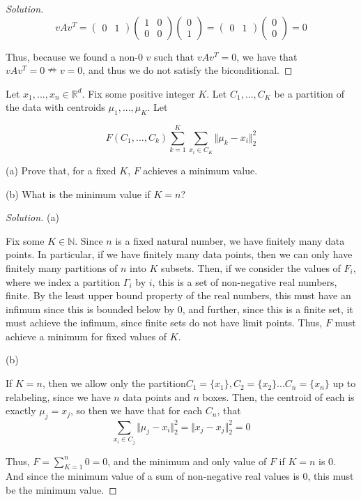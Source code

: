 \documentclass[10pt]{article}
\newenvironment{problem}[2][]{\begin{trivlist}
\item[\hskip \labelsep {\bfseries #1}\hskip \labelsep {\bfseries #2.}]}{\end{trivlist}}
\begin{document}
\begin{proof}[Solution]
$$  v A v^T = \begin{pmatrix} 0 & 1 \end{pmatrix} \begin{pmatrix} 1 & 0 \\ 0 & 0 \end{pmatrix} \begin{pmatrix} 0 \\ 1\end{pmatrix} =   \begin{pmatrix} 0 & 1 \end{pmatrix}\begin{pmatrix} 0 \\ 0\end{pmatrix} = 0$$

Thus, because we found a non-0 $v$ such that $ v A v^T = 0$, we have that $v A v^T  = 0 \nRightarrow v = 0$, and thus we do not satisfy the biconditional.

\end{proof}

\begin{problem}{Question 4}

Let $x_1,...,x_n \in \mathbb{R}^d$. Fix some positive integer $K$. Let $C_1,...,C_K$ be a partition of the data with centroids $\mu_1,...,\mu_K$. Let

$$ F(C_1,...,C_k)  \sum_{k=1}^K \sum_{x_i \in C_K} \Vert \mu_k - x_i \Vert_2^2 $$

(a) Prove that, for a fixed $K$, $F$ achieves a minimum value.

(b) What is the minimum value if $K = n$?

\end{problem}

\begin{proof}[Solution]

(a)

Fix some $K \in \mathbb{N}$. Since $n$ is a fixed natural number, we have finitely many data points. In particular, if we have finitely many data points, then we can only have finitely many partitions of $n$ into $K$ subsets. Then, if we consider the values of $F_i$, where we index a partition $\Gamma_i$ by $i$, this is a set of non-negative real numbers, finite. By the least upper bound property of the real numbers, this must have an infimum since this is bounded below by $0$, and further, since this is a finite set, it must achieve the infimum, since finite sets do not have limit points. Thus, $F$ must achieve a minimum for fixed values of $K$.

(b)

If $K= n$, then we allow only the partition$C_1 = \{x_1\}, C_2 = \{ x_2 \} ... C_n = \{ x_n \}$ up to relabeling, since we have $n$ data points and $n$ boxes. Then, the centroid of each is exactly $\mu_j = x_j$, so then we have that for each $C_n$, that $$\sum_{x_i \in C_j  } \Vert \mu_j - x_i \Vert_2^2 = \Vert x_j - x_j \Vert_2^2 = 0$$ 

Thus, $F = \sum_{K=1}^n 0 = 0$, and the minimum and only value of $F$ if $K = n$ is $0$. And since the minimum value of a sum of non-negative real values is $0$, this must be the minimum value.


\end{proof}
\end{document}
